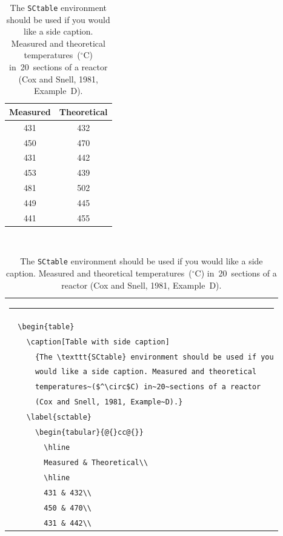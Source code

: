   \begin{table}
      \caption[Table with side caption]
          {The \texttt{SCtable} environment should be used if you
          would like a side caption. Measured and theoretical
          temperatures~($^\circ$C) in~20~sections of a reactor
          (Cox and Snell, 1981, Example~D).}
    \label{sctable}
    \begin{tabular}{@{}cc@{}}
      \hline
      Measured & Theoretical\\
      \hline
      431 & 432\\
      450 & 470\\
      431 & 442\\
      453 & 439\\
      481 & 502\\
      449 & 445\\
      441 & 455\\
      \hline
      \end{tabular}\\[13pt]
      \begin{tabular}{@{}p{0pt}@{}}
      \rule[2pt]{\textwidth}{0.5pt}\\
      \verb"  \begin{table}"\\
      \verb"    \caption[Table with side caption]"\\
      \verb"      {The \texttt{SCtable} environment should be used if you"\\
      \verb"      would like a side caption. Measured and theoretical"\\
      \verb"      temperatures~($^\circ$C) in~20~sections of a reactor"\\
      \verb"      (Cox and Snell, 1981, Example~D).}"\\
      \verb"    \label{sctable}"\\
      \verb"      \begin{tabular}{@{}cc@{}}"\\
      \verb"        \hline"\\
      \verb"        Measured & Theoretical\\"\\
      \verb"        \hline"\\
      \verb"        431 & 432\\"\\
      \verb"        450 & 470\\"\\
      \verb"        431 & 442\\"\\

\end{tabular}
\end{table}
